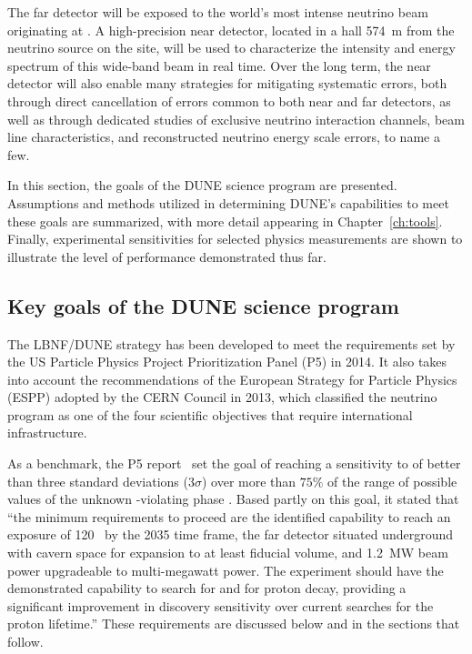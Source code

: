 The far detector will be exposed to the world's most intense 
neutrino beam originating at \fnal{}. A high-precision near 
detector, located in a hall \SI{574}{m} from the neutrino source on 
the \fnal site, will be used to characterize
the intensity and energy spectrum of this wide-band 
beam in real time.  Over the long term, the near detector 
will also enable many strategies for mitigating systematic 
errors, both through direct cancellation of errors common to both near and far detectors, as well as through dedicated studies
of exclusive neutrino interaction channels, beam line characteristics, 
and reconstructed neutrino energy scale errors, to name a few.

In this section, the goals of the DUNE science program are
presented.  Assumptions and methods utilized in determining
DUNE's capabilities to meet these goals are summarized,
with more detail appearing in Chapter~\ref{ch:tools}.
Finally, experimental sensitivities for selected
physics measurements are shown to illustrate the level of 
performance demonstrated thus far.

\subsection{Key goals of the DUNE science program}
\label{sec:exec-key-goals}

The LBNF/DUNE strategy has been developed to meet the
requirements set by the US Particle Physics Project Prioritization Panel
(P5) in 2014. It also takes into account the recommendations
of the European Strategy for Particle Physics (ESPP) adopted
by the CERN Council in 2013, which classified the 
neutrino program as one of the four scientific objectives that
require international infrastructure.

As a benchmark, the P5 report~\cite{p5report2014} set the goal of
reaching a sensitivity to  of better than three
standard deviations (\num{3}$\sigma$) over more than $75\%$
of the range of possible values of the unknown
-violating phase \deltacp.
Based partly on this goal, it stated that ``the
minimum requirements to proceed are the identified capability
to reach an exposure of \num{120}~\ktMWyr{} by the 2035 time
frame, the far detector situated underground with cavern space
for expansion to at least \fdfiducialmass \lar fiducial volume,
and \SI{1.2}{MW} beam power upgradeable to multi-megawatt power.
The experiment should have the demonstrated capability to
search for  and for proton decay, providing a
significant improvement in discovery sensitivity over current
searches for the proton lifetime.''
These requirements are discussed below and in the sections
that follow.

